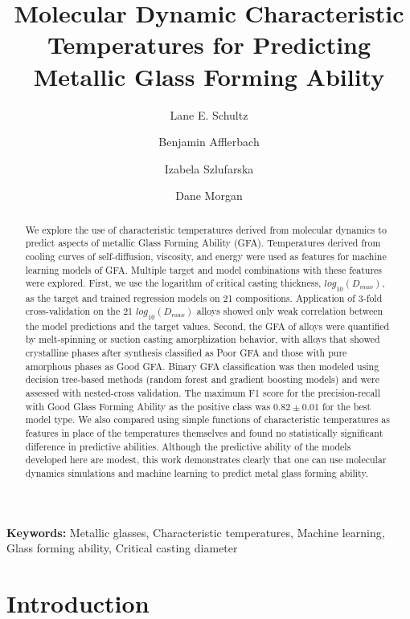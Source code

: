 \documentclass[11pt,a4paper]{article}                                %
\title{Molecular Dynamic Characteristic Temperatures for Predicting Metallic Glass Forming Ability}
\author[a]{Lane E. Schultz}
\author[a]{Benjamin Afflerbach}
\author[a]{Izabela Szlufarska}
\author[a]{Dane Morgan}
\affil[a]{University of Wisconsin-Madison, 1500 engineering Drive, Madison, WI 53706, USA}
\begin{document}
\maketitle

\begin{abstract}
    We explore the use of characteristic temperatures derived from molecular dynamics to predict aspects of metallic Glass Forming Ability (GFA). Temperatures derived from cooling curves of self-diffusion, viscosity, and energy were used as features for machine learning models of GFA. Multiple target and model combinations with these features were explored. First, we use the logarithm of critical casting thickness, $log_{10}(D_{max})$, as the target and trained regression models on 21 compositions. Application of 3-fold cross-validation on the 21 $log_{10}(D_{max})$ alloys showed only weak correlation between the model predictions and the target values. Second, the GFA of alloys were quantified by melt-spinning or suction casting amorphization behavior, with alloys that showed crystalline phases after synthesis classified as Poor GFA and those with pure amorphous phases as Good GFA. Binary GFA classification was then modeled using decision tree-based methods (random forest and gradient boosting models) and were assessed with nested-cross validation. The maximum F1 score for the precision-recall with Good Glass Forming Ability as the positive class was $0.82 \pm 0.01$ for the best model type. We also compared using simple functions of characteristic temperatures as features in place of the temperatures themselves and found no statistically significant difference in predictive abilities. Although the predictive ability of the models developed here are modest, this work demonstrates clearly that one can use molecular dynamics simulations and machine learning to predict metal glass forming ability.
\end{abstract}

{\bf Keywords:} Metallic glasses, Characteristic temperatures, Machine learning, Glass forming ability, Critical casting diameter

\section{Introduction}
\end{document}
